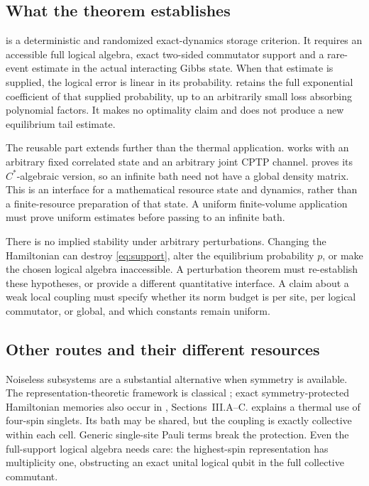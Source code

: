 \documentclass[11pt,reqno]{amsart}
\numberwithin{equation}{section}
\theoremstyle{definition}
\theoremstyle{remark}
\begin{document}
\subsection{What the theorem establishes}

 is a deterministic and randomized exact-dynamics storage
criterion. It requires an accessible full logical algebra, exact
two-sided commutator support and a rare-event estimate in the actual
interacting Gibbs state. When that estimate is supplied, the logical
error is linear in its probability.  retains the
full exponential coefficient of that supplied probability, up to an
arbitrarily small loss absorbing polynomial factors.
It makes no optimality claim and does not produce a new equilibrium
tail estimate.

The reusable part extends further than the thermal application.
 works with an arbitrary fixed correlated state and
an arbitrary joint CPTP channel.  proves its
\(C^*\)-algebraic version, so an infinite bath need not have a global
density matrix. This is an interface for a mathematical resource
state and dynamics, rather than a finite-resource preparation of that
state. A uniform finite-volume application must prove uniform estimates
before passing to an infinite bath.

There is no implied stability under arbitrary perturbations.
Changing the Hamiltonian can destroy \eqref{eq:support}, alter
the equilibrium probability \(p\), or make the chosen logical algebra
inaccessible. A perturbation theorem must re-establish these hypotheses,
or provide a different quantitative interface. A claim about a weak
local coupling must specify whether its norm budget is per site, per
logical commutator, or global, and which constants remain uniform.

\subsection{Other routes and their different resources}

Noiseless subsystems are a substantial alternative when symmetry is
available. The representation-theoretic framework is classical
\cite{KLV00,KBLW01}; exact symmetry-protected Hamiltonian memories
also occur in \cite{WIW22}, Sections~III.A--C.
 explains a thermal use of four-spin singlets.
Its bath may be shared, but the coupling is exactly collective within
each cell. Generic single-site Pauli terms break the protection.
Even the full-support logical algebra needs care: the highest-spin
representation has multiplicity one, obstructing an exact unital
logical qubit in the full collective commutant.
\end{document}
